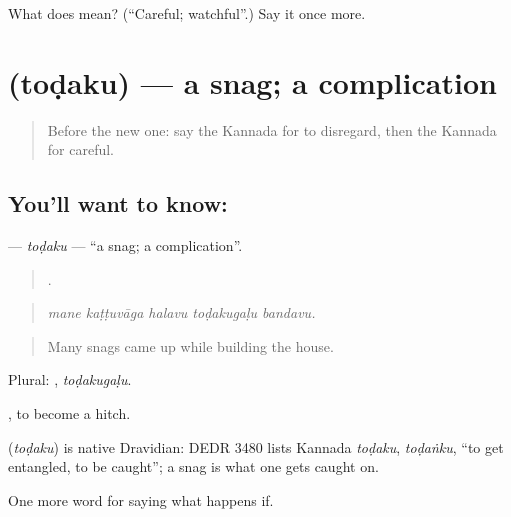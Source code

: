 \begin{tcolorbox}[breakable,colback=teal!4,colframe=teal!35!black,title={Before you move on}]
What does  mean? (\textquotedblleft{}Careful; watchful\textquotedblright{}.) Say it once more.
\end{tcolorbox}
\section[\texorpdfstring{\kn{ತೊಡಕು} (toḍaku)}{ತೊಡಕು (toḍaku)}]{ (toḍaku) — a snag; a complication}

\label{lesson:KA-C426-todaku}



\begin{quote}
Before the new one: say the Kannada for to disregard, then the Kannada for careful.
\end{quote}

\subsection*{You'll want to know: }
\textbf{} — \emph{toḍaku} — \textquotedblleft{}a snag; a complication\textquotedblright{}.

\begin{quote}
    .
\end{quote}

\begin{quote}
\emph{mane kaṭṭuvāga halavu toḍakugaḷu bandavu.}
\end{quote}

\begin{quote}
Many snags came up while building the house.
\end{quote}

Plural: , \emph{toḍakugaḷu}.

, to become a hitch.

\begin{cousinweb}
\textbf{} (\emph{toḍaku}) is native Dravidian: DEDR 3480 lists Kannada \emph{toḍaku}, \emph{toḍaṅku}, \textquotedblleft{}to get entangled, to be caught\textquotedblright{}; a snag is what one gets caught on.
\end{cousinweb}

\begin{grammarlens}[title={What you've built}]
One more word for saying what happens if.
\end{grammarlens}


